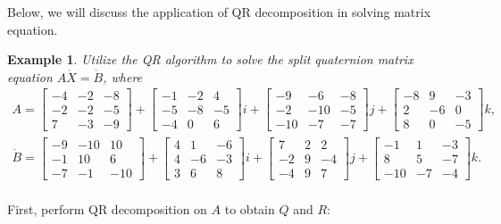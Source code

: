 \documentclass[12pt]{article}
\newtheorem{example}[theorem]{Example}
\numberwithin{equation}{section} %
\begin{document}
Below, we will discuss the application of QR decomposition in solving matrix equation.
\begin{example}
Utilize the QR algorithm to solve the split quaternion matrix equation \(A\dot{X} = \dot{B}\), where
\begin{align*}
A =
\begin{bmatrix}
-4 & -2 & -8 \\
-2 & -2 & -5 \\
7 & -3 & -9
\end{bmatrix} +
\begin{bmatrix}
-1 & -2 & 4 \\
-5 & -8 & -5 \\
-4 & 0 & 6
\end{bmatrix} i +
\begin{bmatrix}
-9 & -6 & -8 \\
-2 & -10 & -5 \\
-10 & -7 & -7
\end{bmatrix} j +
\begin{bmatrix}
-8 & 9 & -3 \\
2 & -6 & 0 \\
8 & 0 & -5
\end{bmatrix} k,
\\
\dot{B} =
\begin{bmatrix}
-9 & -10 & 10 \\
-1 & 10 & 6 \\
-7 & -1 & -10
\end{bmatrix} +
\begin{bmatrix}
4 & 1 & -6 \\
4 & -6 & -3 \\
3 & 6 & 8
\end{bmatrix} i +
\begin{bmatrix}
7 & 2 & 2 \\
-2 & 9 & -4 \\
-4 & 9 & 7
\end{bmatrix} j +
\begin{bmatrix}
-1 & 1 & -3 \\
8 & 5 & -7 \\
-10 & -7 & -4
\end{bmatrix} k.
\\
\end{align*}
\end{example}  
First, perform QR decomposition on $A$ to obtain $Q$ and $R:$
\end{document}
